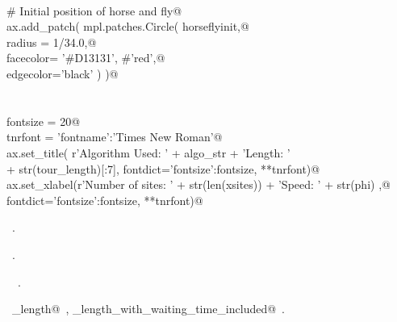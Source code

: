\documentclass[11.5pt]{report}
\begin{document}
\begin{flushleft}
\begin{list}{}{}
\mbox{}\verb@@\\
\mbox{}\verb@    # Initial position of horse and fly@\\
\mbox{}\verb@    ax.add_patch( mpl.patches.Circle( horseflyinit,@\\
\mbox{}\verb@                                      radius = 1/34.0,@\\
\mbox{}\verb@                                      facecolor= '#D13131', #'red',@\\
\mbox{}\verb@                                      edgecolor='black'   )  )@\\
\mbox{}\verb@@\\
\mbox{}\verb@@\\
\mbox{}\verb@    fontsize = 20@\\
\mbox{}\verb@    tnrfont = {'fontname':'Times New Roman'}@\\
\mbox{}\verb@    ax.set_title( r'Algorithm Used: ' + algo_str +  '\nTour Length: ' \@\\
\mbox{}\verb@                    + str(tour_length)[:7], fontdict={'fontsize':fontsize}, **tnrfont)@\\
\mbox{}\verb@    ax.set_xlabel(r'Number of sites: ' + str(len(xsites)) + '\nDrone Speed: ' + str(phi) ,@\\
\mbox{}\verb@                  fontdict={'fontsize':fontsize}, **tnrfont)@\\
\mbox{}\verb@@{\NWsep}
\end{list}
\vspace{-1.5ex}
\footnotesize
\begin{list}{}{\setlength{\itemsep}{-\parsep}\setlength{\itemindent}{-\leftmargin}}
\item \NWtxtMacroDefBy\ .
\item \NWtxtMacroRefIn\ .
\item \NWtxtIdentsDefed\nobreak\  \verb@plotTour@\nobreak\ .\item \NWtxtIdentsUsed\nobreak\  \verb@tour_length@\nobreak\ , \verb@tour_length_with_waiting_time_included@\nobreak\ .
\item{}
\end{list}
\vspace{4ex}
\end{flushleft}
\newchunk 
\end{document}
